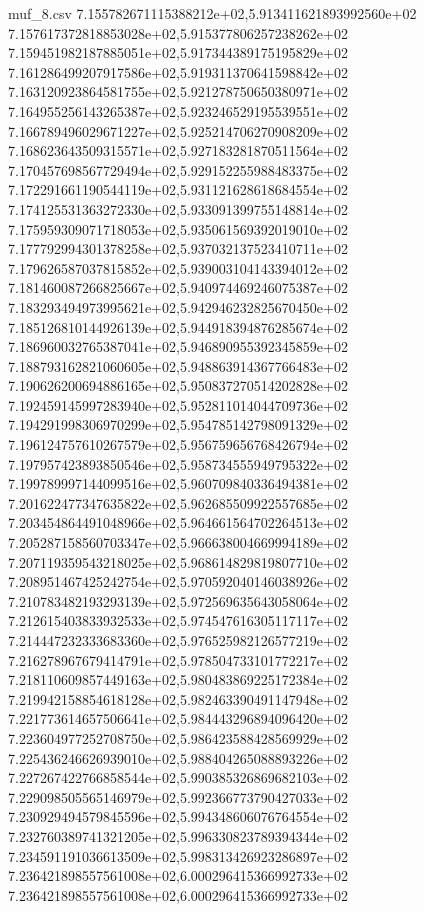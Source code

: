 \begin{filecontents*}{muf_8.csv}
7.155782671115388212e+02,5.913411621893992560e+02
7.157617372818853028e+02,5.915377806257238262e+02
7.159451982187885051e+02,5.917344389175195829e+02
7.161286499207917586e+02,5.919311370641598842e+02
7.163120923864581755e+02,5.921278750650380971e+02
7.164955256143265387e+02,5.923246529195539551e+02
7.166789496029671227e+02,5.925214706270908209e+02
7.168623643509315571e+02,5.927183281870511564e+02
7.170457698567729494e+02,5.929152255988483375e+02
7.172291661190544119e+02,5.931121628618684554e+02
7.174125531363272330e+02,5.933091399755148814e+02
7.175959309071718053e+02,5.935061569392019010e+02
7.177792994301378258e+02,5.937032137523410711e+02
7.179626587037815852e+02,5.939003104143394012e+02
7.181460087266825667e+02,5.940974469246075387e+02
7.183293494973995621e+02,5.942946232825670450e+02
7.185126810144926139e+02,5.944918394876285674e+02
7.186960032765387041e+02,5.946890955392345859e+02
7.188793162821060605e+02,5.948863914367766483e+02
7.190626200694886165e+02,5.950837270514202828e+02
7.192459145997283940e+02,5.952811014044709736e+02
7.194291998306970299e+02,5.954785142798091329e+02
7.196124757610267579e+02,5.956759656768426794e+02
7.197957423893850546e+02,5.958734555949795322e+02
7.199789997144099516e+02,5.960709840336494381e+02
7.201622477347635822e+02,5.962685509922557685e+02
7.203454864491048966e+02,5.964661564702264513e+02
7.205287158560703347e+02,5.966638004669994189e+02
7.207119359543218025e+02,5.968614829819807710e+02
7.208951467425242754e+02,5.970592040146038926e+02
7.210783482193293139e+02,5.972569635643058064e+02
7.212615403833932533e+02,5.974547616305117117e+02
7.214447232333683360e+02,5.976525982126577219e+02
7.216278967679414791e+02,5.978504733101772217e+02
7.218110609857449163e+02,5.980483869225172384e+02
7.219942158854618128e+02,5.982463390491147948e+02
7.221773614657506641e+02,5.984443296894096420e+02
7.223604977252708750e+02,5.986423588428569929e+02
7.225436246626939010e+02,5.988404265088893226e+02
7.227267422766858544e+02,5.990385326869682103e+02
7.229098505565146979e+02,5.992366773790427033e+02
7.230929494579845596e+02,5.994348606076764554e+02
7.232760389741321205e+02,5.996330823789394344e+02
7.234591191036613509e+02,5.998313426923286897e+02
7.236421898557561008e+02,6.000296415366992733e+02
7.236421898557561008e+02,6.000296415366992733e+02
\end{filecontents*}

